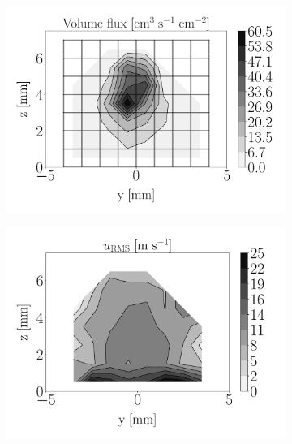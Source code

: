 \begin{figure}[h!]
\vspace*{-0.20in}

\flushleft
\begin{subfigure}[b]{0.2\textwidth}
	\flushleft
	\hspace*{-0.45in}
   \includegraphics[scale=0.19]{./part2_developments/figures_ch6_lagrangian_JICF/injectors_SLI/uG100_dx10_x05_volume_flux_map}
\end{subfigure}
\hspace*{0.075in}
\begin{subfigure}[b]{0.2\textwidth}
	\flushleft
   \includegraphics[scale=0.19]{./part2_developments/figures_ch6_lagrangian_JICF/injectors_SLI/uG100_dx10_x05_ux_RMS_map}
\end{subfigure}

\end{figure}
